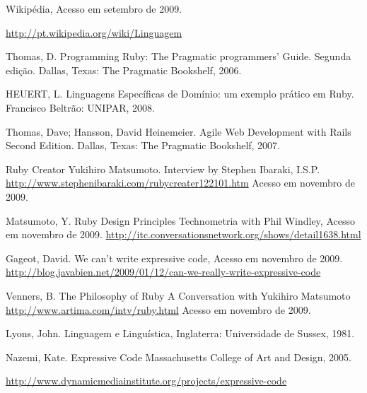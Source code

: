 \documentclass[espaco=simples,appendix=Name]{abnt}
\begin{document}

\begin{thebibliography}{9} 
Wikipédia, 
Acesso em setembro de 2009.

\url{http://pt.wikipedia.org/wiki/Linguagem}

Thomas, D. 
Programming Ruby: The Pragmatic programmers’ Guide. 
Segunda edição. Dallas, Texas: The Pragmatic Bookshelf, 2006.

HEUERT, L. 
Linguagens Específicas de Domínio: um exemplo prático em Ruby.
Francisco Beltrão: UNIPAR, 2008.

Thomas, Dave; Hansson, David Heinemeier.
Agile Web Development with Rails 
Second Edition.  Dallas, Texas: The Pragmatic Bookshelf, 2007.

Ruby Creator Yukihiro Matsumoto.
Interview by Stephen Ibaraki, I.S.P.
\url{http://www.stephenibaraki.com/rubycreater122101.htm}
Acesso em novembro de 2009.

Matsumoto, Y.
Ruby Design Principles
Technometria with Phil Windley, 
Acesso em novembro de 2009.
\url{http://itc.conversationsnetwork.org/shows/detail1638.html}

Gageot, David.
We can’t write expressive code,
Acesso em novembro de 2009.
\url{http://blog.javabien.net/2009/01/12/can-we-really-write-expressive-code}

Venners, B. The Philosophy of Ruby
A Conversation with Yukihiro Matsumoto
\url{http://www.artima.com/intv/ruby.html}
Acesso em novembro de 2009.

Lyons, John.
Linguagem e Linguística,
Inglaterra: Universidade de Sussex, 1981.

Nazemi, Kate.
Expressive Code
Massachusetts College of Art and Design, 2005.

\url{http://www.dynamicmediainstitute.org/projects/expressive-code}

\end{thebibliography} 
\end{document}

